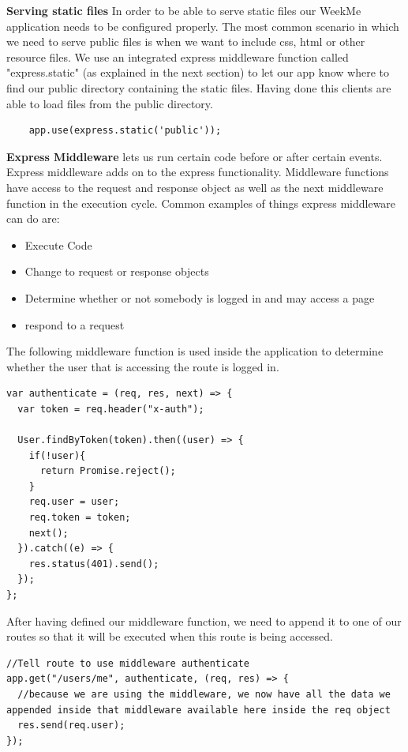 \documentclass[11pt]{article}
\begin{document}
\textbf{Serving static files}
In order to be able to serve static files our WeekMe application needs to be configured properly. The most common scenario in which we need to serve public files is when we want to include css, html or other resource files. We use an integrated express middleware function called "express.static" (as explained in the next section) to let our app know where to find our public directory containing the static files. Having done this clients are able to load files from the public directory.     

\begin{lstlisting}
	app.use(express.static('public'));  
\end{lstlisting}



\textbf{Express Middleware} lets us run certain code before or after certain events. Express middleware adds on to the express functionality. Middleware functions have access to the request and response object as well as the next middleware function in the execution cycle.  Common examples of things express middleware can do are:  

\begin{itemize}
	\item Execute Code
	\item Change to request or response objects
	\item Determine whether or not somebody is logged in and may access a page
	\item respond to a request 
\end{itemize}

The following middleware function is used inside the application to determine whether the user that is accessing the route is logged in.  

\begin{lstlisting}
var authenticate = (req, res, next) => {
  var token = req.header("x-auth");

  User.findByToken(token).then((user) => {
    if(!user){
      return Promise.reject();
    }
    req.user = user;
    req.token = token;
    next(); 
  }).catch((e) => {
    res.status(401).send();
  });
};
\end{lstlisting}  

After having defined our middleware function, we need to append it to one of our routes so that it will be executed when this route is being accessed.   

\begin{lstlisting}
//Tell route to use middleware authenticate
app.get("/users/me", authenticate, (req, res) => {
  //because we are using the middleware, we now have all the data we appended inside that middleware available here inside the req object
  res.send(req.user);
}); 
\end{lstlisting} 
\end{document}
